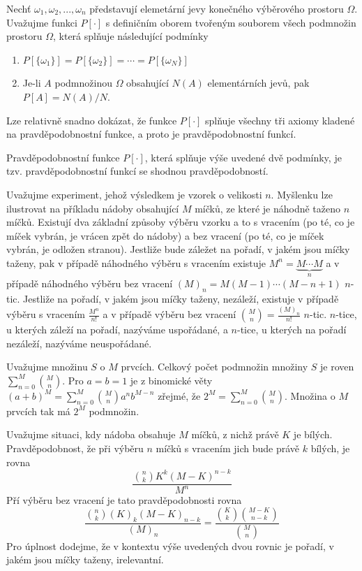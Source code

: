 Nechť $\omega_1, \omega_2, ..., \omega_n$ představují elemetární jevy konečného výběrového prostoru $\Omega$. Uvažujme funkci $P[\cdot]$ s definičním oborem tvořeným souborem všech podmnožin prostoru $\Omega$, která splňuje následující podmínky
\begin{enumerate}
\item $P[\{\omega_1\}] = P[\{\omega_2\}] = \cdots = P[\{\omega_N\}]$
\item Je-li $A$ podmnožinou $\Omega$ obsahující $N(A)$ elementárních jevů, pak $P[A] = N(A)/N$.
\end{enumerate}
Lze relativně snadno dokázat, že funkce $P[\cdot]$ splňuje všechny tři axiomy kladené na pravděpodobnostní funkce, a proto je pravděpodobnostní funkcí.

\begin{definition}
Pravděpodobnostní funkce $P[\cdot]$, která splňuje výše uvedené dvě podmínky, je tzv. pravděpodobnostní funkcí se shodnou pravděpodobností.
\end{definition}

Uvažujme experiment, jehož výsledkem je vzorek o velikosti $n$. Myšlenku lze ilustrovat na příkladu nádoby obsahující $M$ míčků, ze které je náhodně taženo $n$ míčků. Existují dva základní způsoby výběru vzorku a to s vracením (po té, co je míček vybrán, je vrácen zpět do nádoby) a bez vracení (po té, co je míček vybrán, je odložen stranou). Jestliže bude záležet na pořadí, v jakém jsou míčky taženy, pak v případě náhodného výběru s vracením existuje $M^n = \underbrace{M \cdots M}_n$ a v případě náhodného výběru bez vracení $(M)_n = M(M - 1) \cdots (M - n + 1)$ $n$-tic. Jestliže na pořadí, v jakém jsou míčky taženy, nezáleží, existuje v případě výběru s vracením $\frac{M^n}{n!}$ a v případě výběru bez vracení $\binom{M}{n} = \frac{(M)_n}{n!}$ $n$-tic. $n$-tice, u kterých záleží na pořadí, nazýváme uspořádané, a $n$-tice, u kterých na pořadí nezáleží, nazýváme neuspořádané.

\begin{example}
Uvažujme množinu $S$ o $M$ prvcích. Celkový počet podmnožin množiny $S$ je roven $\sum_{n = 0}^M \binom{M}{n}$. Pro  $a = b = 1$ je z binomické věty $(a + b)^M = \sum_{n=0}^M \binom{M}{n}a^nb^{M-n}$ zřejmé, že $2^M = \sum_{n=0}^M \binom{M}{n}$. Množina o $M$ prvcích tak má $2^M$ podmnožin.
\end{example}

Uvažujme situaci, kdy nádoba obsahuje $M$ míčků, z nichž právě $K$ je bílých. Pravděpodobnost, že při výběru $n$ míčků s vracením jich bude právě $k$ bílých, je rovna
\begin{equation*}
\frac{\binom{n}{k}K^k(M-K)^{n-k}}{M^n}
\end{equation*}
Pří výběru bez vracení je tato pravděpodobnosti rovna
\begin{equation*}
\frac{\binom{n}{k}(K)_k(M-K)_{n-k}}{(M)_n} = \frac{\binom{K}{k}\binom{M-K}{n-k}}{\binom{M}{n}}
\end{equation*}
Pro úplnost dodejme, že v kontextu výše uvedených dvou rovnic je pořadí, v jakém jsou míčky taženy, irelevantní.

